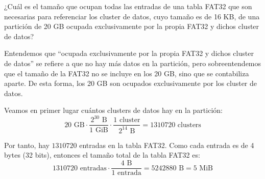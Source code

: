 \begin{ejercicio}
¿Cuál es el tamaño que ocupan todas las entradas de una tabla FAT32 que son necesarias para referenciar los cluster de datos,
cuyo tamaño es de 16 KB, de una partición de 20 GB ocupada exclusivamente por la propia FAT32
y dichos cluster de datos?

\begin{observacion}
    Entendemos que ``ocupada exclusivamente por la propia FAT32
    y dichos cluster de datos'' se refiere a que no hay más datos en la partición, 
    pero sobreentendemos que el tamaño de la FAT32 no se incluye en los 20 GB, sino
    que se contabiliza aparte. De esta forma, los 20 GB son ocupados exclusivamente por
    los cluster de datos.
\end{observacion}

Veamos en primer lugar cuántos clusters de datos hay en la partición:
\begin{equation*}
    20 \text{ GB} \cdot \frac{2^{30} \text{ B}}{1 \text{ GiB}} \cdot \frac{1 \text{ cluster}}{2^{14} \text{ B}} = 1310720 \text{ clusters}
\end{equation*}

Por tanto, hay $1310720$ entradas en la tabla FAT32. Como cada entrada es de 4 bytes (32 bits), entonces
el tamaño total de la tabla FAT32 es:
\begin{equation*}
    1310720 \text{ entradas} \cdot \frac{4 \text{ B}}{1 \text{ entrada}} = 5242880 \text{ B} = 5 \text{ MiB}
\end{equation*}

\end{ejercicio}

